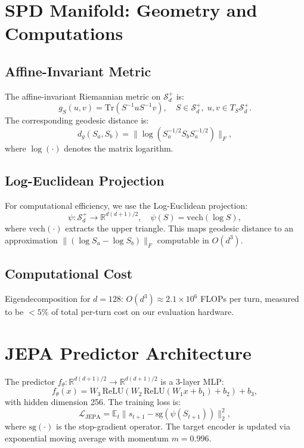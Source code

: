 \documentclass[journal,compsoc]{IEEEtran}
\begin{document}
\section{SPD Manifold: Geometry and Computations}
\label{sec:geometry}

\subsection{Affine-Invariant Metric}
The affine-invariant Riemannian metric on $\mathcal{S}_d^+$ is:
\begin{equation}
  g_S(u,v) = \mathrm{Tr}(S^{-1}uS^{-1}v), \quad S \in \mathcal{S}_d^+,\;
  u,v \in T_S\mathcal{S}_d^+.
\end{equation}
The corresponding geodesic distance is:
\begin{equation}
  d_g(S_a,S_b) = \|\log(S_a^{-1/2}S_b S_a^{-1/2})\|_F,
\end{equation}
where $\log(\cdot)$ denotes the matrix logarithm.

\subsection{Log-Euclidean Projection}
For computational efficiency, we use the Log-Euclidean projection:
\begin{equation}
  \psi: \mathcal{S}_d^+ \to \mathbb{R}^{d(d+1)/2}, \quad
  \psi(S) = \mathrm{vech}(\log S),
\end{equation}
where $\mathrm{vech}(\cdot)$ extracts the upper triangle. This maps geodesic
distance to an approximation $\|(\log S_a - \log S_b)\|_F$ computable in $O(d^3)$.

\subsection{Computational Cost}
Eigendecomposition for $d{=}128$: $O(d^3) \approx 2.1{\times}10^6$ FLOPs per
turn, measured to be $<5\%$ of total per-turn cost on our evaluation hardware.

\section{JEPA Predictor Architecture}
\label{sec:jepa_arch}

The predictor $f_\theta: \mathbb{R}^{d(d+1)/2} \to \mathbb{R}^{d(d+1)/2}$
is a 3-layer MLP:
\begin{equation}
  f_\theta(x) = W_3\,\mathrm{ReLU}(W_2\,\mathrm{ReLU}(W_1 x + b_1) + b_2) + b_3,
\end{equation}
with hidden dimension 256. The training loss is:
\begin{equation}
  \mathcal{L}_\mathrm{JEPA} = \mathbb{E}_t\|\hat{s}_{t+1} -
  \mathrm{sg}(\psi(S_{t+1}))\|_2^2,
\end{equation}
where $\mathrm{sg}(\cdot)$ is the stop-gradient operator. The target encoder
is updated via exponential moving average with momentum $m{=}0.996$.
\end{document}
